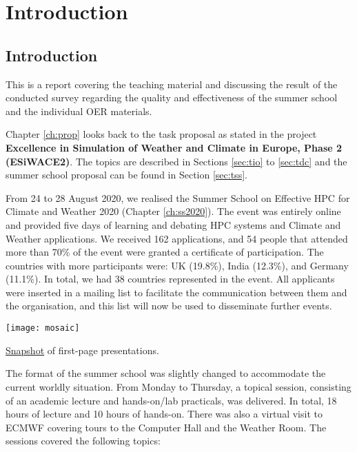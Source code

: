 \chapter{Introduction}
\label{ch:intro}

\section{Introduction}

This is a report covering the teaching material and discussing the result of the conducted survey regarding the quality and effectiveness of the summer school and the individual OER materials.

Chapter \ref{ch:prop} looks back to the task proposal as stated in the project \textbf{Excellence in Simulation of Weather and Climate in Europe, Phase 2 (ESiWACE2)}. The topics are described in Sections \ref{sec:tio} to \ref{sec:tdc} and the summer school proposal can be found in Section \ref{sec:tss}.

From 24 to 28 August 2020, we realised the Summer School on Effective HPC for Climate and Weather 2020 (Chapter \ref{ch:ss2020}). The event was entirely online and provided five days of learning and debating HPC systems and Climate and Weather applications. We received 162 applications, and 54 people that attended more than 70\% of the event were granted a certificate of participation. The countries with more participants were: UK (19.8\%), India (12.3\%), and Germany (11.1\%). In total, we had 38 countries represented in the event. All applicants were inserted in a mailing list to facilitate the communication between them and the organisation, and this list will now be used to disseminate further events.

\begin{table}[H]
\centering
\texttt{[image: mosaic]}
\caption{\href{https://www.photojoiner.net/v/BTvmSc6R}{Snapshot} of first-page presentations.}
\end{table}

The format of the summer school was slightly changed to accommodate the current worldly situation. From Monday to Thursday, a topical session, consisting of an academic lecture and hands-on/lab practicals, was delivered. In total, 18 hours of lecture and 10 hours of hands-on. There was also a virtual visit to ECMWF covering tours to the Computer Hall and the Weather Room. The sessions covered the following topics:

